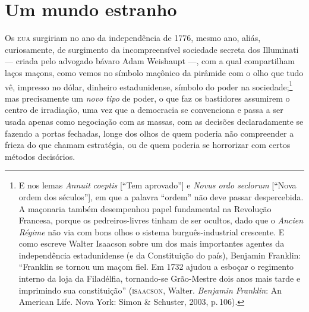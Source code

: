 \section{Um mundo estranho}

Os \textsc{eua} surgiriam no ano da independência de 1776, mesmo ano, aliás,
curiosamente, de surgimento da incompreensível sociedade secreta dos
Illuminati --- criada pelo advogado bávaro Adam Weishaupt ---, com 
a qual compartilham laços maçons, como vemos no símbolo maçônico da pirâmide 
com o olho que tudo vê, impresso no dólar, dinheiro estadunidense, símbolo do 
poder na
sociedade;\footnote{E nos
  lemas \emph{Annuit coeptis} [``Tem aprovado''] e \emph{Novus ordo
  seclorum} [``Nova ordem dos séculos''], em que a palavra ``ordem'' não
  deve passar despercebida. A maçonaria também desempenhou papel
  fundamental na Revolução Francesa, porque os pedreiros-livres tinham
  de ser ocultos, dado que o \emph{Ancien Régime} não via com bons olhos
  o sistema burguês-industrial crescente. E como escreve Walter Isaacson
  sobre um dos mais importantes agentes da independência estadunidense
  (e da Constituição do país), Benjamin Franklin: ``Franklin se tornou
  um maçom fiel. Em 1732 ajudou a esboçar o regimento interno da loja da
  Filadélfia, tornando-se Grão-Mestre dois anos mais tarde e imprimindo
  sua constituição'' (\textsc{isaacson}, Walter. \emph{Benjamin
  Franklin}: An American Life. Nova York: Simon \& Schuster, 2003, p.\,106).}
 mas precisamente um \emph{novo tipo} de poder, o que faz os
bastidores assumirem o centro de irradiação, uma vez que a democracia se
convenciona e passa a ser usada apenas como negociação com as massas,
com as decisões declaradamente se fazendo a portas fechadas, longe dos
olhos de quem poderia não compreender a frieza do que chamam estratégia,
ou de quem poderia se horrorizar com certos métodos decisórios.

